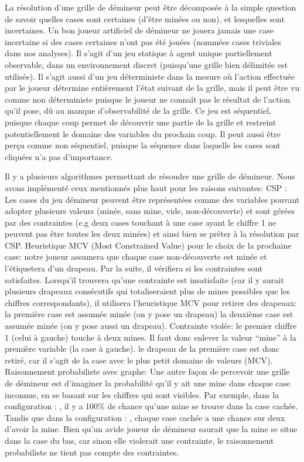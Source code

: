 \documentclass{article}
\begin{document}
La résolution d’une grille de démineur peut être décomposée à la simple question de savoir quelles
cases sont certaines (d’être minées ou non), et lesquelles sont incertaines. Un bon joueur
artificiel de démineur ne jouera jamais une case incertaine si des cases certaines n’ont pas été
jouées (nommées cases triviales dans nos analyses). 
Il s’agit d’un jeu statique à agent unique partiellement observable, dans un environnement discret
(puisqu’une grille bien délimitée est utilisée). Il s’agit aussi d’un jeu déterministe dans la
mesure où l’action effectuée par le joueur détermine entièrement l’état suivant de la grille, mais
il peut être vu comme non déterministe puisque le joueur ne connaît pas le résultat de l’action
qu’il pose, dû au manque d’observabilité de la grille.
Ce jeu est séquentiel, puisque chaque coup permet de découvrir une partie de la grille et restreint
potentiellement le domaine des variables du prochain coup. Il peut aussi être perçu comme non
séquentiel, puisque la séquence dans laquelle les cases sont cliquées n’a pas d’importance.

Il y a plusieurs algorithmes permettant de résoudre une grille de démineur. Nous avons implémenté
ceux mentionnés plus haut pour les raisons suivantes:
CSP : Les cases du jeu démineur peuvent être représentées comme des variables pouvant adopter
plusieurs valeurs (minée, sans mine, vide, non-découverte) et sont gérées par des contraintes (e.g
deux cases touchant à une case ayant le chiffre 1 ne peuvent pas être toutes les deux minées) et
ainsi bien se prêter à la résolution par CSP.
Heuristique MCV (Most Constrained Value) pour le choix de la prochaine case: notre joueur assumera
que chaque case non-découverte est minée et l’étiquetera d’un drapeau. Par la suite, il vérifiera si
les contraintes sont satisfaites. Lorsqu’il trouvera qu’une contrainte est insatisfaite (car il y
aurait plusieurs drapeaux consécutifs qui totaliseraient plus de mines possibles que les chiffres
correspondants), il utilisera l’heuristique MCV pour retirer des drapeaux:
 la première case est assumée minée (on y pose un drapeau)
 la deuxième case est assumée minée (on y pose aussi un drapeau).
 Contrainte violée: le premier chiffre 1 (celui à gauche) touche à deux mines. Il faut donc enlever
 la valeur “mine” à la première variable (la case à gauche).
 le drapeau de la première case est donc retiré, car il s’agit de la case avec le plus petit domaine
 de valeurs (MCV).
 Raisonnement probabiliste avec graphe: Une autre façon de percevoir une grille de démineur est
 d’imaginer la probabilité qu’il y ait une mine dans chaque case inconnue, en se basant sur les
 chiffres qui sont visibles. 
 Par exemple, dans la configuration :
 , il y a 100\% de chance qu’une mine se trouve dans la case cachée.
 Tandis que dans la configuration :
 , chaque case cachée a une chance sur deux d’avoir la mine. Bien qu’un avide joueur de démineur
 saurait que la mine se situe dans la case du bas, car sinon elle violerait une contrainte, le
 raisonnement probabiliste ne tient pas compte des contraintes.
\end{document}
